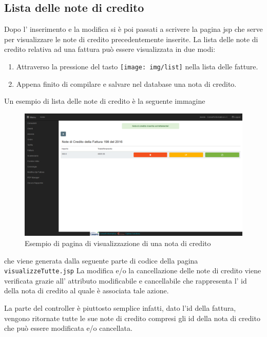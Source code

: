 \documentclass[12pt]{book}
\begin{document}
\subsection{Lista delle note di credito}
Dopo l' inserimento e la modifica si è poi passati a scrivere la pagina jsp
che serve per visualizzare le note di credito precedentemente inserite.
La lista delle note di credito relativa ad una fattura può essere visualizzata
in due modi:
\begin{enumerate}
    \item Attraverso la pressione del tasto \texttt{[image: img/list]}
         nella lista delle fatture.
    \item Appena finito di compilare e salvare nel database una nota di credito.
\end{enumerate}
Un esempio di lista delle note di credito è la seguente immagine
\clearpage
\begin{figure}[H]
    \centering
    \includegraphics[scale=0.4]{img/visualizzazione_note_credito}
    \caption{Esempio di pagina di visualizzazione di una nota di credito}\label{fig:visualizzazione}
\end{figure}
che viene generata dalla seguente parte di codice della pagina \texttt{visualizzeTutte.jsp}
La modifica e/o la cancellazione delle note di credito viene verificata 
grazie all' attributo modificabile e cancellabile che rappresenta l' id della
nota di credito al quale è associata tale azione.

La parte del controller è piuttosto semplice infatti, dato l'id della fattura,
vengono ritornate tutte le sue note di credito compresi gli id della nota di 
credito che può essere modificata e/o cancellata.

\end{document}
